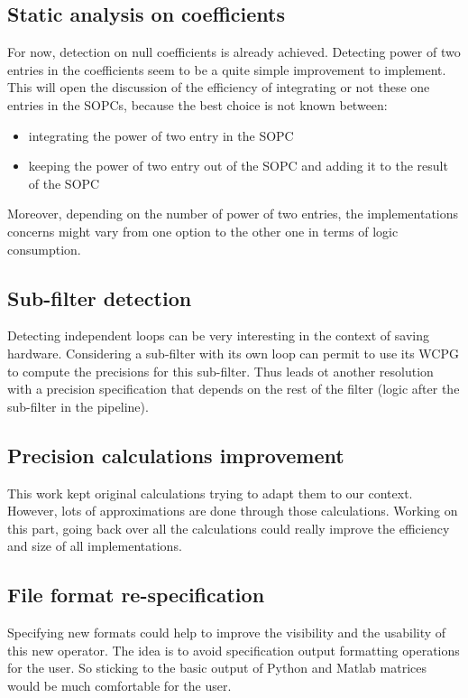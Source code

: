 \subsection{Static analysis on coefficients}
	For now, detection on null coefficients is already achieved.
	Detecting power of two entries in the coefficients seem to be a quite simple improvement to implement.
	This will open the discussion of the efficiency of integrating or not these one entries in the SOPCs, because the best choice is not known between:
	\begin{itemize}
		\item integrating the power of two entry in the SOPC
		\item keeping the power of two entry out of the SOPC and adding it to the result of the SOPC
	\end{itemize}

	Moreover, depending on the number of power of two entries, the implementations concerns might vary from one option to the other one in terms of logic consumption.


\subsection{Sub-filter detection}
	Detecting independent loops can be very interesting in the context of saving hardware.
	Considering a sub-filter with its own loop can permit to use its WCPG to compute the precisions for this sub-filter.
	Thus leads ot another resolution with a precision specification that depends on the rest of the filter (logic after the sub-filter in the pipeline).

\subsection{Precision calculations improvement}
	This work kept original calculations trying to adapt them to our context.
	However, lots of approximations are done through those calculations.
	Working on this part, going back over all the calculations could really improve the efficiency and size of all implementations.


\subsection{File format re-specification}
	Specifying new formats could help to improve the visibility and the usability of this new operator.
	The idea is to avoid specification output formatting operations for the user.
	So sticking to the basic output of Python and Matlab matrices would be much comfortable for the user.

